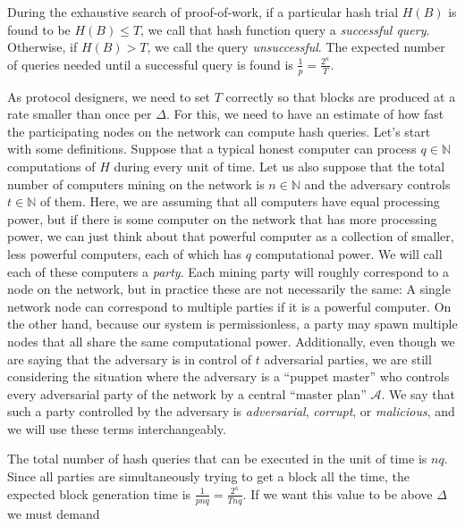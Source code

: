 During the exhaustive search of proof-of-work, if a particular hash trial $H(B)$ is found to be $H(B) \leq T$, we call that hash function query a \emph{successful query}. Otherwise, if $H(B) > T$, we call the query \emph{unsuccessful}. The expected number of queries needed until a successful query is found is $\frac{1}{p} = \frac{2^\kappa}{T}$.

As protocol designers, we need to set $T$ correctly so that blocks are produced at a rate smaller than once per $\Delta$. For this, we need to have an estimate of how fast the participating nodes on the network can compute hash queries. Let's start with some definitions. Suppose that a typical honest computer can process
$q \in \mathbb{N}$
computations of $H$ during every unit of time. Let us also suppose that the total number of computers mining on the network is
$n \in \mathbb{N}$
and the adversary controls
$t \in \mathbb{N}$
of them. Here, we are assuming that all computers have equal processing power, but if there is some computer on the network that has more processing power, we can just think about that powerful computer as a collection of smaller, less powerful computers, each of which has $q$ computational power. We will call each of these computers a
\emph{party}.
Each mining party will roughly correspond to a node on the network, but in practice these are not necessarily the same: A single network node can correspond to multiple parties if it is a powerful computer. On the other hand, because our system is permissionless, a party may spawn multiple nodes that all share the same computational power. Additionally, even though we are saying that the adversary is in control of $t$ adversarial parties, we are still considering the situation where the adversary is a ``puppet master'' who controls every adversarial party of the network by a central ``master plan'' $\mathcal{A}$. We say that such a party controlled by the adversary is \emph{adversarial}, \emph{corrupt}, or \emph{malicious}, and we will use these terms interchangeably.

The total number of hash queries that can be executed in the unit of time is $nq$.
Since all parties are simultaneously trying to get a block all the time, the expected block generation
time is $\frac{1}{pnq} = \frac{2^\kappa}{Tnq}$. If we want this value to be above $\Delta$ we must demand

